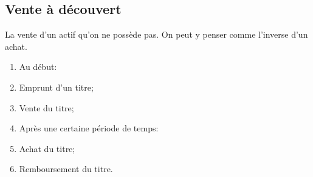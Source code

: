 \documentclass[10pt, french]{article}
\begin{document}
\begin{multicols*}{2}

\columnbreak
\subsection{Vente à découvert}

\begin{definitionNOHFILL} 
La vente d'un actif qu'on ne possède pas. On peut y penser comme l'inverse d'un achat.\\

\begin{algo2}
\begin{multicols*}{2}
\begin{enumerate}[leftmargin = *]
	\item[]	Au début:\\
	\item 	Emprunt d'un titre;
	\item	Vente du titre;
	\item[]	Après une certaine période de temps:
	\item	Achat du titre;
	\item	Remboursement du titre.
\end{enumerate}	
\end{multicols*}
\end{algo2}
\end{definitionNOHFILL}


\end{multicols*}
\end{document}

